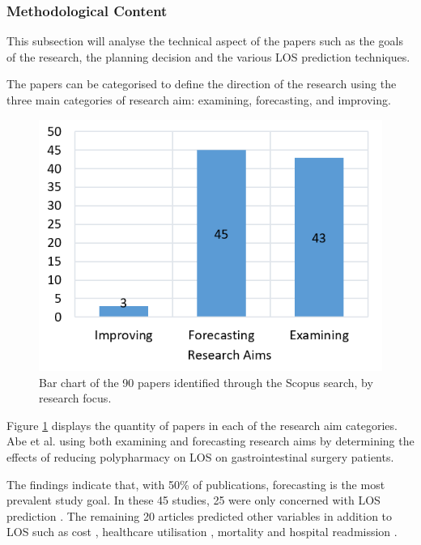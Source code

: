 \documentclass[../thesis.tex]{subfiles}
\begin{document}
\subsubsection{Methodological Content}
This subsection will analyse the technical aspect of the papers such as the goals of the research, the planning decision and the various LOS prediction techniques.

The papers can be categorised to define the direction of the research using the three main categories of research aim: examining, forecasting, and improving.

\begin{figure}[h!]
    \centering
    \includegraphics[scale=1]{Chapters/Chapter2/Figures3/2lrresearchaim.png}
    \caption{Bar chart of the 90 papers identified through the Scopus search, by research focus.}
    \label{fig:litreview2-aims}
\end{figure}

Figure \ref{fig:litreview2-aims} displays the quantity of papers in each of the research aim categories. Abe et al. \cite{Abe} using both examining and forecasting research aims by determining the effects of reducing polypharmacy on LOS on gastrointestinal surgery patients. 

The findings indicate that, with 50\% of publications, forecasting is the most prevalent study goal. In these 45 studies, 25 were only concerned with LOS prediction \cite{Abe,Alyahya2017,Antonelli2001,Basic2009,Beauchet2018,Bo2015,Bo2016,Cacciatore2012,Curiati2020,Ferreira2019,Gordon2,Hoben2019,Hu2022,Launay2015,Launay2018,Lisk2018,Marano2022,Marshall2,Nishino2019,Pustavoitau2016,Sommerfeld2001,Sommerfeld2011,Takahashi2011,Willems2012,Zhao2020a}. The remaining 20 articles predicted other variables in addition to LOS such as cost \cite{Feuerstadt2022,Tropea2016}, healthcare utilisation \cite{Fan2021}, mortality \cite{Bahrmann2018,Feuerstadt2022, Volpato2014} and hospital readmission \cite{Bahrmann2018, Morandi2013, Rajamaki2020}.
\end{document}
